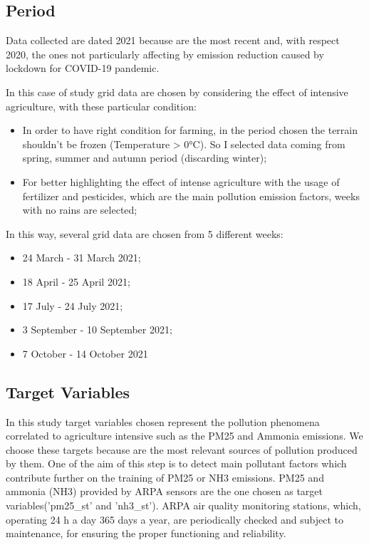 \par
\subsection{Period}  
Data collected are dated 2021 because are the most recent and, with respect 2020, the ones not particularly affecting by emission reduction caused by lockdown for COVID-19 pandemic\cite{bontempi2022analysis}. 

In this case of study grid data are chosen by considering the effect of intensive agriculture, with these particular condition:
    \begin{itemize}
        \item In order to have right condition for farming, in the period chosen the terrain shouldn't be frozen (Temperature > 0°C). So I selected data coming from spring, summer and autumn period (discarding winter);
        \item For better highlighting the effect of intense agriculture with the usage of fertilizer and pesticides, which are the main pollution emission factors, weeks with no rains are selected;
\end{itemize}
In this way, several grid data are chosen from 5 different weeks:
\begin{itemize}
    \item 24 March - 31 March 2021;
    \item 18 April - 25 April 2021;
    \item 17 July - 24 July 2021;
    \item 3 September - 10 September 2021;
    \item 7 October - 14 October 2021
\end{itemize}

\subsection{Target Variables}
In this study target variables chosen represent the pollution phenomena correlated to agriculture intensive  such as the PM25 and Ammonia emissions. We choose these targets because are the most relevant sources of pollution produced by them.\newline
One of the aim of this step is to detect main pollutant factors which contribute further on the training of PM25 or NH3 emissions.
PM25 and ammonia (NH3) provided by ARPA sensors are the one chosen as target variables('pm25\_st' and 'nh3\_st'). 
ARPA air quality monitoring stations, which, operating 24 h a day 365 days a year, are periodically checked and subject to maintenance, for ensuring the proper functioning and reliability.

